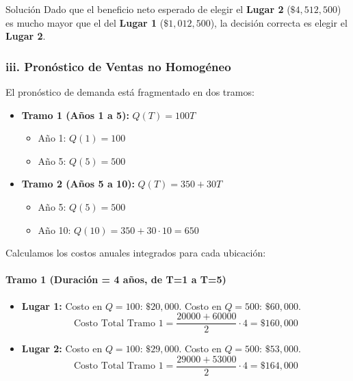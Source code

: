 \documentclass[11pt, a4paper]{article}
\begin{document}
\begin{ejercicio}{Solución}
  Dado que el beneficio neto esperado de elegir el \textbf{Lugar 2} ($\$4,512,500$) es mucho mayor que el del \textbf{Lugar 1} ($\$1,012,500$), la decisión correcta es elegir el \textbf{Lugar 2}.

  \subsubsection*{iii. Pronóstico de Ventas no Homogéneo}
  El pronóstico de demanda está fragmentado en dos tramos:
  \begin{itemize}
    \item \textbf{Tramo 1 (Años 1 a 5):} $Q(T) = 100T$
      \begin{itemize}
        \item Año 1: $Q(1) = 100$
        \item Año 5: $Q(5) = 500$
      \end{itemize}
    \item \textbf{Tramo 2 (Años 5 a 10):} $Q(T) = 350 + 30T$
      \begin{itemize}
        \item Año 5: $Q(5) = 500$
        \item Año 10: $Q(10) = 350 + 30 \cdot 10 = 650$
      \end{itemize}
  \end{itemize}

  Calculamos los costos anuales integrados para cada ubicación:

  \paragraph{Tramo 1 (Duración = 4 años, de T=1 a T=5)}
  \begin{itemize}
    \item \textbf{Lugar 1:}
      Costo en $Q=100$: $\$20,000$. Costo en $Q=500$: $\$60,000$.
      \begin{equation*}
        \text{Costo Total Tramo 1} = \frac{20000 + 60000}{2} \cdot 4 = \$160,000
      \end{equation*}
    \item \textbf{Lugar 2:}
      Costo en $Q=100$: $\$29,000$. Costo en $Q=500$: $\$53,000$.
      \begin{equation*}
        \text{Costo Total Tramo 1} = \frac{29000 + 53000}{2} \cdot 4 = \$164,000
      \end{equation*}
  \end{itemize}


\end{ejercicio}
\end{document}
